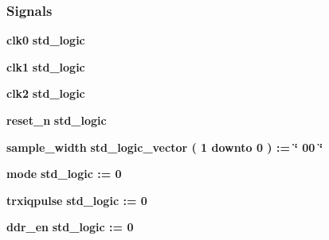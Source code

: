 \subsubsection*{Signals}
 \begin{DoxyCompactItemize}
\item 
{\bf clk0} {\bfseries \textcolor{comment}{std\+\_\+logic}\textcolor{vhdlchar}{ }} 
\item 
{\bf clk1} {\bfseries \textcolor{comment}{std\+\_\+logic}\textcolor{vhdlchar}{ }} 
\item 
{\bf clk2} {\bfseries \textcolor{comment}{std\+\_\+logic}\textcolor{vhdlchar}{ }} 
\item 
{\bf reset\+\_\+n} {\bfseries \textcolor{comment}{std\+\_\+logic}\textcolor{vhdlchar}{ }} 
\item 
{\bf sample\+\_\+width} {\bfseries \textcolor{comment}{std\+\_\+logic\+\_\+vector}\textcolor{vhdlchar}{ }\textcolor{vhdlchar}{(}\textcolor{vhdlchar}{ }\textcolor{vhdlchar}{ } \textcolor{vhdldigit}{1} \textcolor{vhdlchar}{ }\textcolor{keywordflow}{downto}\textcolor{vhdlchar}{ }\textcolor{vhdlchar}{ } \textcolor{vhdldigit}{0} \textcolor{vhdlchar}{ }\textcolor{vhdlchar}{)}\textcolor{vhdlchar}{ }\textcolor{vhdlchar}{ }\textcolor{vhdlchar}{ }\textcolor{vhdlchar}{\+:}\textcolor{vhdlchar}{=}\textcolor{vhdlchar}{ }\textcolor{vhdlchar}{ }\textcolor{vhdlchar}{ }\textcolor{vhdlchar}{ }\textcolor{keyword}{\char`\"{} 00 \char`\"{}}\textcolor{vhdlchar}{ }} 
\item 
{\bf mode} {\bfseries \textcolor{comment}{std\+\_\+logic}\textcolor{vhdlchar}{ }\textcolor{vhdlchar}{ }\textcolor{vhdlchar}{\+:}\textcolor{vhdlchar}{=}\textcolor{vhdlchar}{ }\textcolor{vhdlchar}{ }\textcolor{vhdlchar}{\textquotesingle{}}\textcolor{vhdlchar}{ } \textcolor{vhdldigit}{0} \textcolor{vhdlchar}{ }\textcolor{vhdlchar}{\textquotesingle{}}\textcolor{vhdlchar}{ }} 
\item 
{\bf trxiqpulse} {\bfseries \textcolor{comment}{std\+\_\+logic}\textcolor{vhdlchar}{ }\textcolor{vhdlchar}{ }\textcolor{vhdlchar}{\+:}\textcolor{vhdlchar}{=}\textcolor{vhdlchar}{ }\textcolor{vhdlchar}{ }\textcolor{vhdlchar}{\textquotesingle{}}\textcolor{vhdlchar}{ } \textcolor{vhdldigit}{0} \textcolor{vhdlchar}{ }\textcolor{vhdlchar}{\textquotesingle{}}\textcolor{vhdlchar}{ }} 
\item 
{\bf ddr\+\_\+en} {\bfseries \textcolor{comment}{std\+\_\+logic}\textcolor{vhdlchar}{ }\textcolor{vhdlchar}{ }\textcolor{vhdlchar}{\+:}\textcolor{vhdlchar}{=}\textcolor{vhdlchar}{ }\textcolor{vhdlchar}{ }\textcolor{vhdlchar}{\textquotesingle{}}\textcolor{vhdlchar}{ } \textcolor{vhdldigit}{0} \textcolor{vhdlchar}{ }\textcolor{vhdlchar}{\textquotesingle{}}\textcolor{vhdlchar}{ }} 

\end{DoxyCompactItemize}
